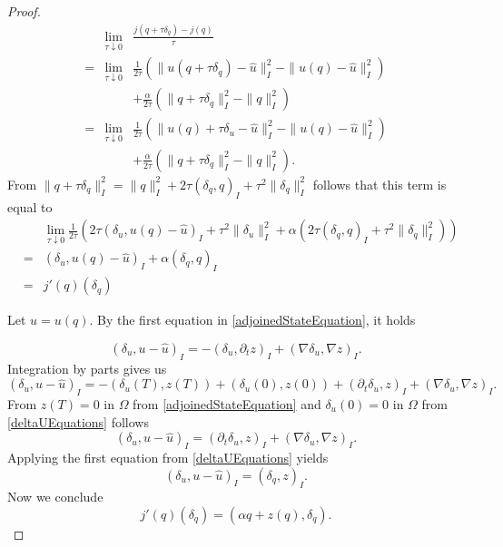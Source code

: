 \begin{proof}
\begin{eqnarray*}
&\lim_{\tau\downarrow0}&\frac{j(q+\tau\delta_q)-j(q)}{\tau}\\
=&\lim_{\tau\downarrow0}&\frac{1}{2\tau}\left(\|u(q+\tau\delta_q)-\hat{u}\|^2_I-\|u(q)-\hat{u}\|^2_I\right)\\
&&+\frac{\alpha}{2\tau}\left(\|q+\tau\delta_q\|^2_I-\|q\|^2_I\right)\\
=&\lim_{\tau\downarrow0}&\frac{1}{2\tau}\left(\|u(q)+\tau\delta_u-\hat{u}\|^2_I-\|u(q)-\hat{u}\|^2_I\right)\\
&&+\frac{\alpha}{2\tau}\left(\|q+\tau\delta_q\|^2_I-\|q\|^2_I\right).
\end{eqnarray*}
From $\|q+\tau\delta_q\|^2_I=\|q\|^2_I+2\tau(\delta_q,q)_I+\tau^2\|\delta_q\|^2_I$ follows that this term is equal to
\begin{eqnarray*}
&&\lim_{\tau\downarrow0}\frac{1}{2\tau}\left(2\tau(\delta_u,u(q)-\hat{u})_I+\tau^2\|\delta_u\|^2_I+\alpha\left(2\tau(\delta_q,q)_I+\tau^2\|\delta_q\|^2_I\right)\right)\\
&=&(\delta_u,u(q)-\hat{u})_I+\alpha(\delta_q,q)_I\\
&=&j'(q)(\delta_q)
\end{eqnarray*}

Let $u=u(q)$. By the first equation in \eqref{adjoinedStateEquation}, it holds

\begin{equation*}
(\delta_u,u-\hat{u})_I=-(\delta_u,\partial_tz)_I+(\nabla\delta_u,\nabla z)_I.
\end{equation*}
Integration by parts gives us
\begin{equation*}
(\delta_u,u-\hat{u})_I=-(\delta_u(T),z(T))+(\delta_u(0),z(0))+(\partial_t\delta_u,z)_I+(\nabla\delta_u,\nabla z)_I.
\end{equation*}
From $z(T)=0\text{ in }\Omega$ from \eqref{adjoinedStateEquation} and $\delta_u(0)=0\text{ in }\Omega$ from \eqref{deltaUEquations} follows
\begin{equation*}
(\delta_u,u-\hat{u})_I=(\partial_t\delta_u,z)_I+(\nabla\delta_u,\nabla z)_I.
\end{equation*}
Applying the first equation from \eqref{deltaUEquations} yields
\begin{equation*}
(\delta_u,u-\hat{u})_I=(\delta_q,z)_I.
\end{equation*}
Now we conclude
\begin{equation*}
j'(q)(\delta_q)=(\alpha q+z(q),\delta_q).
\end{equation*}
\end{proof}

